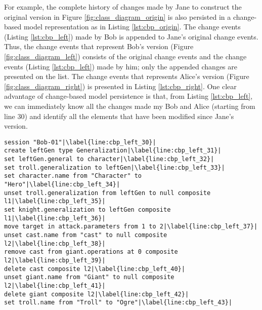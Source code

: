 For example, the complete history of changes made by Jane to construct the original version in Figure \ref{fig:class_diagram_origin} is also persisted in a change-based model representation as in Listing \ref{lst:cbp_origin}. The change events (Listing \ref{lst:cbp_left}) made by Bob is appended to Jane's original change events. Thus, the change events that represent Bob's version (Figure \ref{fig:class_diagram_left}) consists of the original change events and the change events (Listing \ref{lst:cbp_left}) made by him; only the appended changes are presented on the list. The change events that represents Alice's version (Figure \ref{fig:class_diagram_right}) is presented in Listing \ref{lst:cbp_right}. One clear advantage of change-based model persistence is that, from Listing \ref{lst:cbp_left}, we can immediately know all the changes made my Bob and Alice (starting from line 30) and identify all the elements that have been modified since Jane's version.  


\begin{lstlisting}[firstnumber=30,style=eol,escapechar=|,caption={The appended events made by Bob to produce the left version in Fig. \ref{fig:class_diagram_left} (left version).},label=lst:cbp_left]
session "Bob-01"|\label{line:cbp_left_30}|
create leftGen type Generalization|\label{line:cbp_left_31}|
set leftGen.general to character|\label{line:cbp_left_32}|
set troll.generalization to leftGen|\label{line:cbp_left_33}|
set character.name from "Character" to "Hero"|\label{line:cbp_left_34}|
unset troll.generalization from leftGen to null composite l1|\label{line:cbp_left_35}|
set knight.generalization to leftGen composite l1|\label{line:cbp_left_36}|
move target in attack.parameters from 1 to 2|\label{line:cbp_left_37}|
unset cast.name from "cast" to null composite l2|\label{line:cbp_left_38}|
remove cast from giant.operations at 0 composite l2|\label{line:cbp_left_39}|
delete cast composite l2|\label{line:cbp_left_40}|
unset giant.name from "Giant" to null composite l2|\label{line:cbp_left_41}|
delete giant composite l2|\label{line:cbp_left_42}|
set troll.name from "Troll" to "Ogre"|\label{line:cbp_left_43}|
\end{lstlisting}

